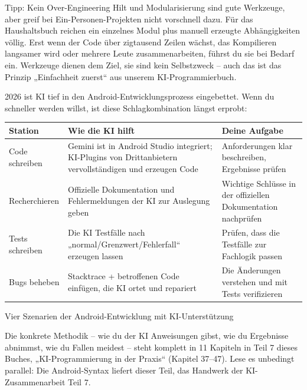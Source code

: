 \begin{tcbinfo}{Tipp: Kein Over-Engineering}
Hilt und Modularisierung sind gute Werkzeuge, aber greif bei Ein-Personen-Projekten nicht vorschnell dazu. Für das Haushaltsbuch reichen ein einzelnes Modul plus manuell erzeugte Abhängigkeiten völlig. Erst wenn der Code über zigtausend Zeilen wächst, das Kompilieren langsamer wird oder mehrere Leute zusammenarbeiten, führst du sie bei Bedarf ein. Werkzeuge dienen dem Ziel, sie sind kein Selbstzweck – auch das ist das Prinzip „Einfachheit zuerst“ aus unserem KI-Programmierbuch.

\end{tcbinfo}


2026 ist KI tief in den Android-Entwicklungsprozess eingebettet. Wenn du schneller werden willst, ist diese Schlagkombination längst erprobt:

\begin{center}
\begin{tabularx}{\linewidth}{|X|X|X|}
\hline
\textbf{Station} & \textbf{Wie die KI hilft} & \textbf{Deine Aufgabe} \tabularnewline
\hline
Code schreiben & Gemini ist in Android Studio integriert; KI-Plugins von Drittanbietern vervollständigen und erzeugen Code & Anforderungen klar beschreiben, Ergebnisse prüfen \tabularnewline
Recherchieren & Offizielle Dokumentation und Fehlermeldungen der KI zur Auslegung geben & Wichtige Schlüsse in der offiziellen Dokumentation nachprüfen \tabularnewline
Tests schreiben & Die KI Testfälle nach „normal/Grenzwert/Fehlerfall“ erzeugen lassen & Prüfen, dass die Testfälle zur Fachlogik passen \tabularnewline
Bugs beheben & Stacktrace + betroffenen Code einfügen, die KI ortet und repariert & Die Änderungen verstehen und mit Tests verifizieren \tabularnewline
\hline
\end{tabularx}
\end{center}

\begin{center}\small\color{gray}Vier Szenarien der Android-Entwicklung mit KI-Unterstützung\end{center}

Die konkrete Methodik – wie du der KI Anweisungen gibst, wie du Ergebnisse abnimmst, wie du Fallen meidest – steht komplett in 11 Kapiteln in Teil 7 dieses Buches, „KI-Programmierung in der Praxis“ (Kapitel 37–47). Lese es unbedingt parallel: Die Android-Syntax liefert dieser Teil, das Handwerk der KI-Zusammenarbeit Teil 7.

